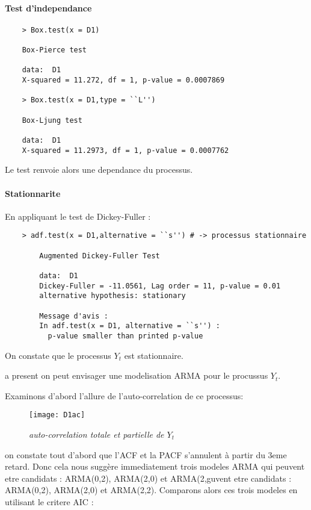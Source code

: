    \paragraph{Test d'independance}

    \begin{verbatim}
    > Box.test(x = D1)

    Box-Pierce test

    data:  D1
    X-squared = 11.272, df = 1, p-value = 0.0007869

    > Box.test(x = D1,type = ``L'')

    Box-Ljung test

    data:  D1
    X-squared = 11.2973, df = 1, p-value = 0.0007762

    \end{verbatim}

    Le test renvoie alors une dependance du processus.
    \paragraph{Stationnarite}

    En appliquant le test de Dickey-Fuller :
    \begin{verbatim}
    > adf.test(x = D1,alternative = ``s'') # -> processus stationnaire

        Augmented Dickey-Fuller Test

        data:  D1
        Dickey-Fuller = -11.0561, Lag order = 11, p-value = 0.01
        alternative hypothesis: stationary

        Message d'avis :
        In adf.test(x = D1, alternative = ``s'') :
          p-value smaller than printed p-value
    \end{verbatim}
    On constate que le processus $Y_t$ est stationnaire.
    
    a present on peut envisager une modelisation ARMA pour le procussus
    $Y_t$.

    Examinons d'abord l'allure de l'auto-correlation de ce processus:
    \begin{figure}[H]
        \centering 
        \label{fig:D1ac} 
        \texttt{[image: D1ac]} 
        \caption{\it auto-correlation totale et partielle de $Y_t$ } 
    \end{figure} 

    on constate tout d'abord que l'ACF et la PACF s'annulent à partir du 3eme
    retard. Donc cela nous suggère immediatement trois modeles ARMA qui peuvent
    etre candidats : ARMA(0,2), ARMA(2,0) et ARMA(2,guvent etre candidats :
    ARMA(0,2), ARMA(2,0) et ARMA(2,2). 
    Comparons alors ces trois modeles en utilisant le critere AIC :

